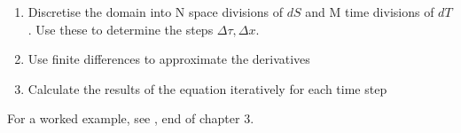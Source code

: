 \begin{enumerate}
	\item Discretise the domain into N space divisions of $dS$ and M time divisions of $dT$. Use these to determine the steps $\Delta\tau,\Delta x$.
	\item Use finite differences to approximate the derivatives
	\item Calculate the results of the equation iteratively for each time step
\end{enumerate}

For a worked example, see \cite{advancedquantcpp}, end of chapter 3.

